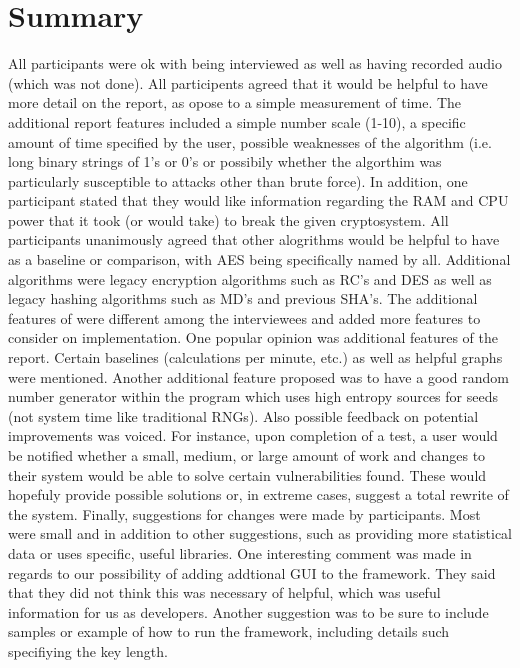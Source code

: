 \section{Summary}

All participants were ok with being interviewed as well as having recorded audio (which was not done). All participents agreed that it would be helpful to have more detail on the report, as opose to a simple measurement of time. The additional report features included a simple number scale (1-10), a specific amount of time specified by the user, possible weaknesses of the algorithm (i.e. long binary strings of 1's or 0's or possibily whether the algorthim was particularly susceptible to attacks other than brute force). In addition, one participant stated that they would like information regarding the RAM and CPU power that it took (or would take) to break the given cryptosystem. All participants unanimously agreed that other alogrithms would be helpful to have as a baseline or comparison, with AES being specifically named by all. Additional algorithms were legacy encryption algorithms such as RC's and DES as well as legacy hashing algorithms such as MD's and previous SHA's. The additional features of \cry{} were different among the interviewees and added more features to consider on implementation. One popular opinion was additional features of the report. Certain baselines (calculations per minute, etc.) as well as helpful graphs were mentioned. Another additional feature proposed was to have a good random number generator within the program which uses high entropy sources for seeds (not system time like traditional RNGs). Also possible feedback on potential improvements was voiced. For instance, upon completion of a test, a user would be notified whether a small, medium, or large amount of work and changes to their system would be able to solve certain vulnerabilities found. These would hopefuly provide possible solutions or, in extreme cases, suggest a total rewrite of the system. Finally, suggestions for changes were made by participants. Most were small and in addition to other suggestions, such as providing more statistical data or uses specific, useful libraries. One interesting comment was made in regards to our possibility of adding addtional GUI to the framework. They said that they did not think this was necessary of helpful, which was useful information for us as developers. Another suggestion was to be sure to include samples or example of how to run the framework, including details such specifiying the key length.

